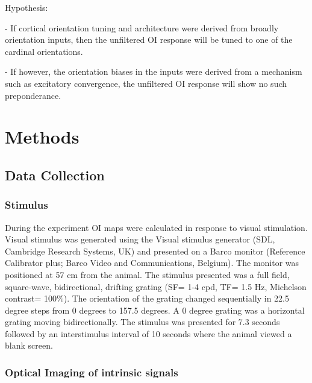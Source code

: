 	Hypothesis:


	- If cortical orientation tuning and architecture were derived from broadly orientation inputs, then the unfiltered OI response will be tuned to one of the cardinal orientations.


	- If however, the orientation biases in the inputs were derived from a mechanism such as excitatory convergence, the unfiltered OI response will show no such preponderance.
	
	
	\pagebreak
		
	\section{Methods}
	
	\subsection{Data Collection}
		
		\subsubsection{Stimulus}	
		
		During the experiment OI maps were calculated in response to visual stimulation. Visual stimulus was generated using the Visual stimulus generator (SDL, Cambridge Research Systems, UK) and presented on a Barco monitor (Reference Calibrator plus; Barco Video and Communications, Belgium).  The monitor was positioned at 57 cm from the animal. The stimulus presented was a full field, square-wave, bidirectional, drifting grating (SF= 1-4 cpd, TF= 1.5 Hz, Michelson contrast= 100\%). The orientation of the grating changed sequentially in 22.5 degree steps from 0 degrees to 157.5 degrees. A 0 degree grating was a horizontal grating moving bidirectionally. The stimulus was presented for 7.3 seconds followed by an interstimulus interval of 10 seconds where the animal viewed a blank screen.
		
		\subsubsection{Optical Imaging of intrinsic signals}
				

